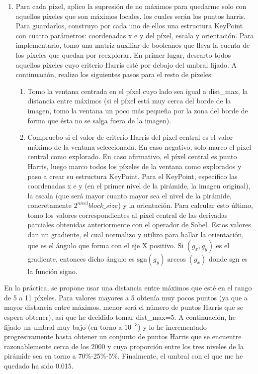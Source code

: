\documentclass[10pt,a4paper]{article}
\begin{document}
\begin{enumerate}
	\item Para cada píxel, aplico la supresión de no máximos para quedarme solo con aquellos píxeles que son máximos locales, los cuales serán los puntos harris. Para guardarlos, construyo por cada uno de ellos una estructura KeyPoint con cuatro parámetros: coordenadas x e y del píxel, escala y orientación. Para implementarlo, tomo una matriz auxiliar de booleanos que lleva la cuenta de los píxeles que quedan por reexplorar. En primer lugar, descarto todos aquellos píxeles cuyo criterio Harris esté por debajo del umbral fijado. A continuación, realizo los siguientes pasos para el resto de píxeles:
	\begin{enumerate}
		\item Tomo la ventana centrada en el píxel cuyo lado sea igual a dist\_max, la distancia entre máximos (si el píxel está muy cerca del borde de la imagen, tomo la ventana un poco más pequeña por la zona del borde de forma que ésta no se salga fuera de la imagen).
		\item Compruebo si el valor de criterio Harris del píxel central es el valor máximo de la ventana seleccionada. En caso negativo, solo marco el píxel central como explorado. En caso afirmativo, el píxel central es punto Harris, luego marco todos los píxeles de la ventana como explorados y paso a crear su estructura KeyPoint. Para el KeyPoint, especifico las coordenadas x e y (en el primer nivel de la pirámide, la imagen original), la escala (que será mayor cuanto mayor sea el nivel de la pirámide, concretamente $2^{nivel}block\_size$) y la orientación. Para calcular esto último, tomo los valores correspondientes al píxel central de las derivadas parciales obtenidas anteriormente con el operador de Sobel. Estos valores dan un gradiente, el cual normalizo y utilizo para hallar la orientación, que es el ángulo que forma con el eje X positivo. Si $(g_x,g_y)$ es el gradiente, entonces dicho ángulo es $\text{sgn}(g_y) \arccos (g_x)$ donde sgn es la función signo.
	\end{enumerate}
\end{enumerate}

En la práctica, se propone usar una distancia entre máximos que esté en el rango de 5 a 11 píxeles. Para valores mayores a 5 obtenía muy pocos puntos (ya que a mayor distancia entre máximos, menor será el número de puntos Harris que se espera obtener), así que he decidido tomar dist\_max=5. A continuación, he fijado un umbral muy bajo (en torno a $10^{-3}$) y lo he incrementado progresivamente hasta obtener un conjunto de puntos Harris que se encuentre razonablemente cerca de los 2000 y cuya proporción entre los tres niveles de la pirámide sea en torno a 70\%-25\%-5\%. Finalmente, el umbral con el que me he quedado ha sido 0.015.
\end{document}
